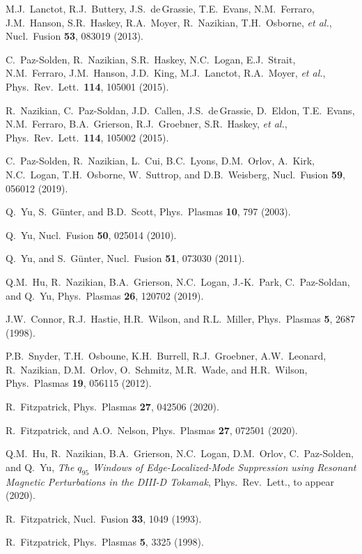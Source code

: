 \documentclass[12pt,prb,aps]{revtex4-1}
\begin{document}
\begin{thebibliography}{99}
 M.J.~Lanctot, R.J.~Buttery, J.S.~de\,Grassie, T.E.~Evans, N.M.~Ferraro, J.M.~Hanson, S.R.~Haskey,  R.A.~Moyer, R.~Nazikian, T.H.~Osborne, {\em et al.}, 
Nucl.\ Fusion {\bf 53}, 083019 (2013). 

 C.~Paz-Solden, R.~Nazikian, S.R.~Haskey, N.C.~Logan, E.J.~Strait, N.M.~Ferraro, J.M.~Hanson, J.D.~King, M.J.~Lanctot, R.A.~Moyer, {\it et al.}, 
Phys.\ Rev.\ Lett.\ {\bf 114}, 105001 (2015).

 R.~Nazikian, C.~Paz-Soldan, J.D.~Callen,  J.S.~de\,Grassie, D.~Eldon, T.E.~Evans, N.M.~Ferraro,  B.A.~Grierson, R.J.~Groebner, S.R.~Haskey, {\em et al.}, 
Phys.\ Rev.\ Lett.\ {\bf 114}, 105002 (2015).

 C.~Paz-Solden, R.~Nazikian, L.~Cui, B.C.~Lyons,  D.M.~Orlov, A.~Kirk, N.C.~Logan, T.H.~Osborne, W.~Suttrop, and D.B.~Weisberg, 
Nucl.\ Fusion {\bf 59}, 056012 (2019). 

 Q.~Yu, S.~G\"{u}nter,  and B.D.~Scott, Phys.\ Plasmas {\bf 10}, 797 (2003).

 Q.~Yu, Nucl.\ Fusion {\bf 50}, 025014 (2010).

 Q.~Yu, and S.~G\"unter,  Nucl.\ Fusion {\bf 51},  073030 (2011).

 Q.M.~Hu,  R.~Nazikian,  B.A.~Grierson,  N.C.~Logan,  J.-K.~Park,  C.~Paz-Soldan, and Q.~Yu,  Phys.\ Plasmas {\bf 26}, 120702 (2019).
 
 J.W.~Connor,  R.J.~Hastie, H.R.~Wilson, and R.L.~Miller, Phys.\ Plasmas  {\bf 5}, 2687 (1998).

  P.B.~Snyder, T.H.~Osboune, K.H.~Burrell, R.J.~Groebner, A.W.~Leonard, R.~Nazikian, D.M.~Orlov, O.~Schmitz, M.R.~Wade, and H.R.~Wilson, 
 Phys.\ Plasmas {\bf 19}, 056115 (2012).

 R.~Fitzpatrick, Phys.\ Plasmas {\bf 27}, 042506 (2020).

 R.~Fitzpatrick, and A.O.~Nelson, Phys.\ Plasmas {\bf 27}, 072501 (2020).

 Q.M.~Hu, R.~Nazikian, B.A.~Grierson, N.C.~Logan, D.M.~Orlov, C.~Paz-Solden, and Q.~Yu,
{\em The $q_{95}$ Windows of Edge-Localized-Mode Suppression using Resonant Magnetic Perturbations in the DIII-D Tokamak}, 
Phys.\ Rev.\ Lett., to appear (2020).

 R.~Fitzpatrick, Nucl.\ Fusion {\bf 33}, 1049 (1993).

 R.~Fitzpatrick, Phys.\ Plasmas {\bf 5}, 3325 (1998).


\end{thebibliography}
\end{document}
